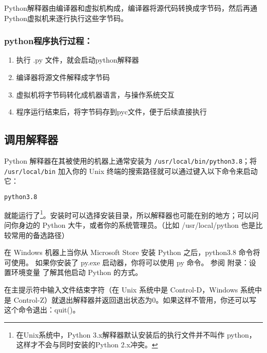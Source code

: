 
\begin{issues}
\issueTODO
\issueDraft
\end{issues}


Python解释器由编译器和虚拟机构成，编译器将源代码转换成字节码，然后再通Python虚拟机来逐行执行这些字节码。

\subsubsection{python程序执行过程：}

\begin{enumerate}
\item 执行 .py 文件，就会启动python解释器

\item 编译器将源文件解释成字节码

\item 虚拟机将字节码转化成机器语言，与操作系统交互

\item 程序运行结束后，将字节码存到pyc文件，便于后续直接执行
\end{enumerate}

\subsection{调用解释器}
Python 解释器在其被使用的机器上通常安装为 \verb|/usr/local/bin/python3.8|；将 \verb|/usr/local/bin| 加入你的 Unix 终端的搜索路径就可以通过键入以下命令来启动它：

\begin{lstlisting}[language=bash]
python3.8
\end{lstlisting}

就能运行了\footnote{在Unix系统中，Python 3.x解释器默认安装后的执行文件并不叫作 python，这样才不会与同时安装的Python 2.x冲突。}。安装时可以选择安装目录，所以解释器也可能在别的地方；可以问问你身边的 Python 大牛，或者你的系统管理员。（比如 /usr/local/python 也是比较常用的备选路径）

在 Windows 机器上当你从 Microsoft Store 安装 Python 之后，python3.8 命令将可使用。 如果你安装了 py.exe 启动器，你将可以使用 py 命令。 参阅 附录：设置环境变量 了解其他启动 Python 的方式。

在主提示符中输入文件结束字符（在 Unix 系统中是 Control-D，Windows 系统中是 Control-Z）就退出解释器并返回退出状态为0。如果这样不管用，你还可以写这个命令退出：quit()。

